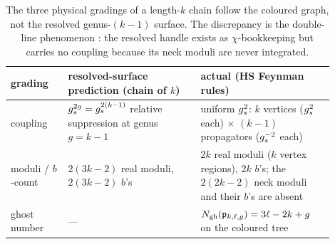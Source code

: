 \begin{table}[htp]
	\centering
	\begin{tabular}{p{0.16\linewidth}p{0.37\linewidth}p{0.37\linewidth}}
		\toprule
		grading & resolved-surface prediction (chain of $k$) & actual (HS Feynman rules) \\
		\midrule
		coupling
		& $g_s^{2g}=g_s^{2(k-1)}$ relative suppression at genus $g=k-1$
		& uniform $g_s^{2}$: $k$ vertices ($g_s^2$ each) $\times$ $(k{-}1)$ propagators ($g_s^{-2}$ each) \\
		moduli / $b$-count
		& $2(3k-2)$ real moduli, $2(3k-2)$ $b$'s
		& $2k$ real moduli ($k$ vertex regions), $2k$ $b$'s; the $2(2k-2)$ neck moduli and their $b$'s are absent \\
		ghost number
		& ---
		& $N_{\text{gh}}(\mathfrak{p}_{k,\ell,g})=3\ell-2k+g$ on the coloured tree \\
		\bottomrule
	\end{tabular}
	\caption{The three physical gradings of a length-$k$ chain follow the coloured
	graph, not the resolved genus-$(k-1)$ surface. The
	discrepancy is the double-line phenomenon \cite{tHooft1974}: the resolved
	handle exists as $\chi$-bookkeeping but carries no coupling because its neck
	moduli are never integrated.}
	\label{rs:tab:grading}
\end{table}

